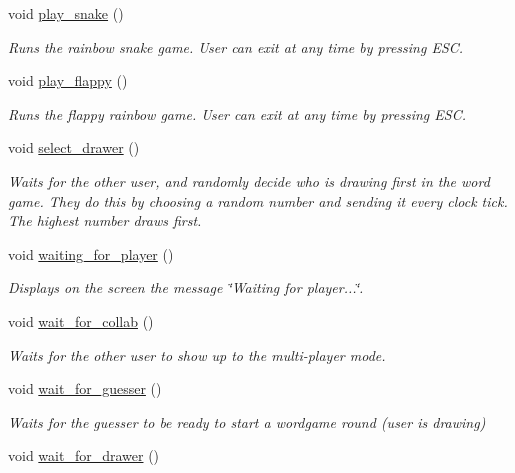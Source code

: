 \begin{DoxyCompactItemize}
void \mbox{\hyperlink{group__pengoo_gab63f8a21d8bd92b9f638151a9912fa84}{play\+\_\+snake}} ()
\begin{DoxyCompactList}\small\item\em Runs the rainbow snake game. User can exit at any time by pressing E\+SC. \end{DoxyCompactList}\item 
void \mbox{\hyperlink{group__pengoo_ga2ef126f11a398bb34f581d5eca368e6b}{play\+\_\+flappy}} ()
\begin{DoxyCompactList}\small\item\em Runs the flappy rainbow game. User can exit at any time by pressing E\+SC. \end{DoxyCompactList}\item 
void \mbox{\hyperlink{group__pengoo_gab4e279f31fb3e6e034e2b173aaa1a2fb}{select\+\_\+drawer}} ()
\begin{DoxyCompactList}\small\item\em Waits for the other user, and randomly decide who is drawing first in the word game. They do this by choosing a random number and sending it every clock tick. The highest number draws first. \end{DoxyCompactList}\item 
void \mbox{\hyperlink{group__pengoo_gad1277ef243282251ffd9bc319abf4cac}{waiting\+\_\+for\+\_\+player}} ()
\begin{DoxyCompactList}\small\item\em Displays on the screen the message \char`\"{}\+Waiting for player...\char`\"{}. \end{DoxyCompactList}\item 
void \mbox{\hyperlink{group__pengoo_ga92c88d0b081234c242ddccf22be99782}{wait\+\_\+for\+\_\+collab}} ()
\begin{DoxyCompactList}\small\item\em Waits for the other user to show up to the multi-\/player mode. \end{DoxyCompactList}\item 
void \mbox{\hyperlink{group__pengoo_ga19cfab1706132a19749fc519f84d9445}{wait\+\_\+for\+\_\+guesser}} ()
\begin{DoxyCompactList}\small\item\em Waits for the guesser to be ready to start a wordgame round (user is drawing) \end{DoxyCompactList}\item 
void \mbox{\hyperlink{group__pengoo_ga45d4be7b19d3dd0ea742f0a489112c80}{wait\+\_\+for\+\_\+drawer}} ()

\end{DoxyCompactItemize}
